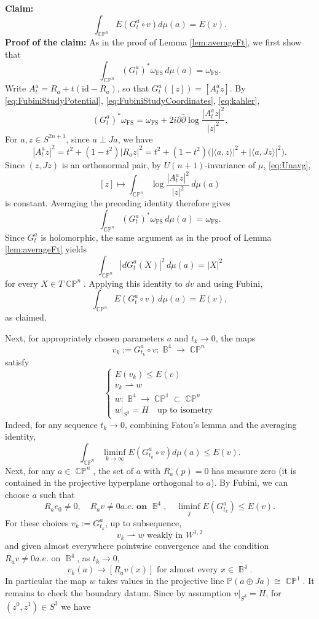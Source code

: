 \documentclass[11pt]{article}
\theoremstyle{plain}
\numberwithin{equation}{section}
\theoremstyle{definition}
\DeclareMathOperator{\CP}{\mathbb{CP}}
\DeclareMathOperator{\B}{\mathbb{B}}
\begin{document}
\textbf{Claim:}
    \[
    \int_{\CP^n}E(G_t^a\circ v)d\mu(a)=E(v).
\]
\textbf{Proof of the claim:} As in the proof of Lemma \ref{lem:averageFt}, we first show that
\[
\int_{\CP^n}(G_t^a)^*\omega_{\mathrm{FS}}\,d\mu(a)=\omega_{\mathrm{FS}}.
\]
Write $A_t^a=R_a+t(\mathrm{id}-R_a)$, so that $G_t^a([z])=[A_t^az]$. By \eqref{eq:FubiniStudyPotential}, \eqref{eq:FubiniStudyCoordinates}, \eqref{eq:kahler},
\[
(G_t^a)^*\omega_{\mathrm{FS}}=\omega_{\mathrm{FS}}+2i\partial\bar\partial\log\frac{|A_t^az|^2}{|z|^2}.
\]
For $a,z\in S^{2n+1}$, since $a\perp Ja$, we have
\[
|A_t^az|^2=t^2+(1-t^2)|R_az|^2
=t^2+(1-t^2)\bigl(|\langle a,z\rangle|^2+|\langle a,Jz\rangle|^2\bigr).
\]
Since $(z,Jz)$ is an orthonormal pair, by $U(n+1)$-invariance of $\mu$, \eqref{eq:Unavg}, 
\[
[z]\longmapsto\int_{\CP^n}\log\frac{|A_t^az|^2}{|z|^2}\,d\mu(a)
\]
is constant. Averaging the preceding identity therefore gives
\[
\int_{\CP^n}(G_t^a)^*\omega_{\mathrm{FS}}\,d\mu(a)=\omega_{\mathrm{FS}}.
\]
Since $G_t^a$ is holomorphic, the same argument as in the proof of Lemma \ref{lem:averageFt} yields
\[
\int_{\CP^n}|dG_t^a(X)|^2\,d\mu(a)=|X|^2
\]
for every $X\in T\CP^n$. Applying this identity to $dv$ and using Fubini,
\[
\int_{\CP^n}E(G_t^a\circ v)\,d\mu(a)=E(v),
\]
as claimed.

Next, for appropriately chosen parameters $a$ and $t_k\to 0$, the maps 
\[
    v_k:= G^a _{t_k}\circ v:\B^4 \to \CP^n
\]
satisfy
\[
    \begin{cases}
        E(v_k)\leq E(v)\\
        v_k\rightharpoonup w\\
        w:\B^4\to\CP^1\subset\CP^n\\
        w\vert_{S^3}= H\quad \text{up to isometry}
    \end{cases}
\]
Indeed, for any sequence $t_k\to 0$, combining Fatou's lemma and the averaging identity,
\[
    \int_{\CP^n}\liminf\limits_{k\to\infty}E(G_{t_k}^a\circ v)d\mu(a)\leq E(v).
\]
Next, for any $a\in\CP^n$, the set of $a$ with $R_a(p)=0$ has measure zero (it is contained in the projective hyperplane orthogonal to $a$). By Fubini, we can choose $a$ such that
\[
    R_a e_0\neq 0, \quad R_a v\neq 0 a.e. \textbf{ on }\B^4, \quad \liminf\limits_jE(G_{t_k}^a)\leq E(v).
\]
For these choices $v_k:= G_{t_k}^a$, up to subsequence,
\[
    v_k\rightharpoonup w \text{ weakly in }W^{1,2}
\]
and given almost everywhere pointwise convergence and the condition $R_a v\neq 0 a.e. \text{ on }\B^4$, as $t_k\to 0$, 
\[
    v_k(a)\to [R_a v(x)]\text{ for almost every }x\in \B^4.
\]
In particular the map $w$ takes values in the projective line $\mathbb{P}(a\oplus Ja)\cong \CP^1$. It remains to check the boundary datum. Since by assumption $v|_{S^3}=H$, for $(z^0,z^1)\in S^3$ we have
\end{document}
